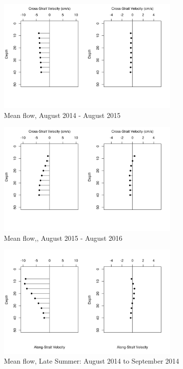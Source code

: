 \documentclass[12pt]{dforeport}
\begin{document}
\pagebreak
\newpage

\begin{figure}  
\centering
\includegraphics[width = 0.8\textwidth]{./figures/36_amf_2014_2015.png}
\caption[Mean flow, 2014-2015]{Mean flow, August 2014 - August 2015}
\label{f:amf_2014_2015}
\end{figure}

\begin{figure}  
\centering
\includegraphics[width = 0.8\textwidth]{./figures/37_amf_2015_2016.png}
\caption[Mean flow, 2015-2016]{Mean flow,, August 2015 - August 2016}
\label{f:amf_2015_2016}
\end{figure}


\begin{figure}  
\centering
\includegraphics[width = 0.8\textwidth]{./figures/38_smf_lateSummer_2014.png}
\caption[Mean flow, Late Summer, 2014]{Mean flow, Late Summer: August 2014 to September 2014}
\label{f:smf_ls_2014}
\end{figure}
\end{document}
